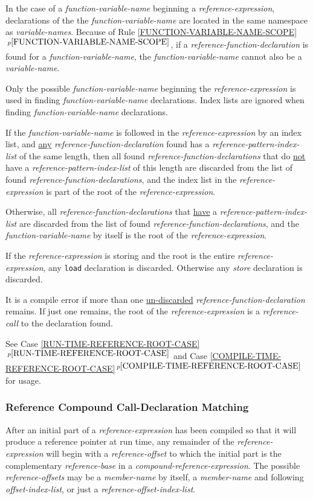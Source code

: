 \documentclass[12pt]{article}
\newcommand{\itemref}[1]{\ref{#1}$\,^{p\pageref{#1}}$}
\begin{document}
In the case of a {\em function-variable-name} beginning
a {\em reference-expression},
declarations of the the {\em function-variable-name} are
located in the same namespace as {\em variable-names}.
Because of Rule \itemref{FUNCTION-VARIABLE-NAME-SCOPE}, if a
{\em reference-function-declaration} is found for a
{\em function-variable-name}, the {\em function-variable-name} cannot also
be a {\em variable-name}.

Only the possible {\em function-variable-name} beginning the
{\em reference-expression} is used in finding
{\em function-variable-name} declarations.
Index lists are ignored when finding {\em function-variable-name} declarations.

If the {\em function-variable-name} is followed in the
{\em reference-expression} by an index list, and \underline{any}
{\em reference-function-declaration} found has a
{\em reference-pattern-index-list} of the same length,
then all found {\em reference-function-declarations}
that do \underline{not} have a
{\em reference-pattern-index-list} of this length are discarded from the
list of found {\em reference-function-declarations}, and the
index list in the {\em reference-expression} is part of the
root of the {\em reference-expression}.

Otherwise, all {\em reference-function-declarations} that \underline{have}
a {\em reference-pattern-index-list} are discarded from the
list of found {\em reference-function-declarations}, and the
{\em function-variable-name} by itself is the
root of the {\em reference-expression}.

If the {\em reference-expression} is storing and the root is the entire
{\em reference-expression}, any {\tt load} declaration is discarded.
Otherwise any {\em store} declaration is discarded.

It is a compile error if more than one
\underline{un-discarded} {\em reference-function-declaration}
remains.  If just one remains, the root of the {\em reference-expression}
is a {\em reference-call} to the declaration found.

See Case \itemref{RUN-TIME-REFERENCE-ROOT-CASE}
and Case \itemref{COMPILE-TIME-REFERENCE-ROOT-CASE}
for usage.

\subsubsection{Reference Compound Call-Declaration Matching}
\label{REFERENCE-COMPOUND-CALL-DECLARATION-MATCHING}

After an initial part of a {\em reference-expression} has been
compiled so that it will produce a reference pointer at run time,
any remainder of the {\em reference-expression} will begin with
a {\em reference-offset} to which the initial part is the
complementary {\em reference-base} in a {\em compound-reference-expression}.
The possible {\em reference-offsets} may be a {\em member-name} by itself,
a {\em member-name} and following {\em offset-index-list},
or just a {\em reference-offset-index-list}.
\end{document}
